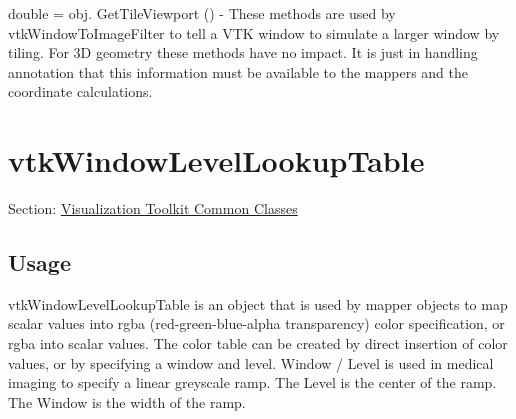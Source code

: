 \begin{DoxyItemize}
\item {\ttfamily double = obj. Get\-Tile\-Viewport ()} -\/ These methods are used by vtk\-Window\-To\-Image\-Filter to tell a V\-T\-K window to simulate a larger window by tiling. For 3\-D geometry these methods have no impact. It is just in handling annotation that this information must be available to the mappers and the coordinate calculations.  
\end{DoxyItemize}\hypertarget{vtkcommon_vtkwindowlevellookuptable}{}\section{vtk\-Window\-Level\-Lookup\-Table}\label{vtkcommon_vtkwindowlevellookuptable}
Section\-: \hyperlink{sec_vtkcommon}{Visualization Toolkit Common Classes} \hypertarget{vtkwidgets_vtkxyplotwidget_Usage}{}\subsection{Usage}\label{vtkwidgets_vtkxyplotwidget_Usage}
vtk\-Window\-Level\-Lookup\-Table is an object that is used by mapper objects to map scalar values into rgba (red-\/green-\/blue-\/alpha transparency) color specification, or rgba into scalar values. The color table can be created by direct insertion of color values, or by specifying a window and level. Window / Level is used in medical imaging to specify a linear greyscale ramp. The Level is the center of the ramp. The Window is the width of the ramp.

